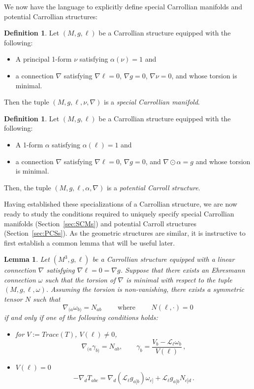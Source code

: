 \documentclass{article}
\newtheorem{lemma}[theorem]{Lemma}
\theoremstyle{definition}
\newtheorem{definition}[theorem]{Definition}
\theoremstyle{remark}
\begin{document}
We now have the language to explicitly define special Carrollian manifolds and potential Carrollian structures:
\begin{definition}
    \label{def:SCM}
    Let $(M,g,\ell)$ be a Carrollian structure equipped with the following:
    \begin{itemize}
        \item A principal 1-form $\nu$ satisfying $\alpha(\nu) = 1$ and
        \item a connection $\nabla$ satisfying $\nabla \ell = 0$, $\nabla g = 0$, $\nabla \nu = 0$, and whose torsion is minimal.
    \end{itemize}
    Then the tuple $(M,g,\ell,\nu,\nabla)$ is a \textit{special Carrollian manifold}.
\end{definition}
\begin{definition} \label{def:PCS}
Let $(M,g,\ell)$ be a Carrollian structure equipped with the following:
\begin{itemize}
    \item A 1-form $\alpha$ satisfying $\alpha(\ell) = 1$ and 
    \item a connection $\nabla$ satisfying $\nabla \ell = 0$, $\nabla g = 0$, and $ \nabla \odot \alpha = g$
    and whose torsion is minimal.
\end{itemize}
Then, the tuple $(M,g,\ell,\alpha,\nabla)$ is a \textit{potential Carroll structure}.
\end{definition}

Having established these specializations of a Carrollian structure, we are now ready to study the conditions required to uniquely specify special Carrollian manifolds (Section~\ref{sec:SCMs}) and potential Carroll structures (Section~\ref{sec:PCSs}). As the geometric structures are similar, it is instructive to first establish a common lemma that will be useful later.

\begin{lemma} \label{nonvanishing-torsion-lemma}
    Let $(M^3,g,\ell)$ be a Carrollian structure equipped with a linear connection $\nabla$ satisfying $\nabla \ell = 0 = \nabla g$.
    Suppose that there exists an Ehresmann connection $\omega$ such that the torsion of $\nabla$ is minimal with respect to the tuple $(M,g,\ell,\omega)$. Assuming the torsion is non-vanishing, there exists a symmetric tensor $N$ such that
    $$\nabla_{(a} \omega_{b)} = N_{ab}\qquad \text{ where } \qquad N(\ell, \cdot) = 0$$
    if and only if one of the following conditions holds:
        \begin{itemize}
        \item for $V := Trace(T)$,  $V(\ell) \neq 0$, 
        $$\nabla_{(a}\gamma_{b)} = N_{ab}, \qquad \gamma_b = \frac{V_b-\mathcal{L}_\ell \omega_b}{V(\ell)} \,, $$
        \item $V(\ell) = 0$  
        $$-\nabla_d T_{abc} = \nabla_d (\mathcal{L}_\ell g_{a[b}) \omega_{c]} + \mathcal{L}_\ell g_{a[b} N_{c]d}\,. $$
    \end{itemize}
\end{lemma}
\end{document}
